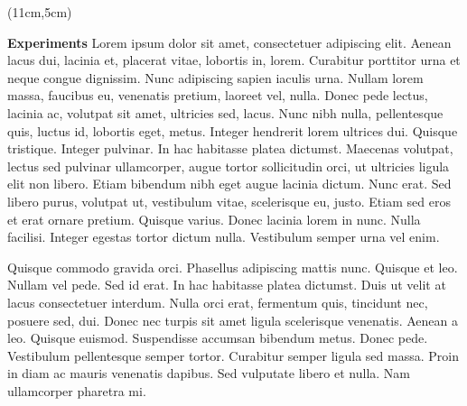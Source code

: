 \documentclass[oneside,final]{beamer}
\begin{document}
\begin{textblock*}{9cm}(11cm,5cm)\noindent%
\begin{beamerboxesrounded}[shadow=false,upper=block2up,lower=block2down]{\large\textbf{Experiments}}
Lorem ipsum dolor sit amet, consectetuer adipiscing elit. Aenean lacus dui, lacinia et, placerat vitae, lobortis in, lorem. Curabitur porttitor urna et neque congue dignissim. Nunc adipiscing sapien iaculis urna. Nullam lorem massa, faucibus eu, venenatis pretium, laoreet vel, nulla. Donec pede lectus, lacinia ac, volutpat sit amet, ultricies sed, lacus. Nunc nibh nulla, pellentesque quis, luctus id, lobortis eget, metus. Integer hendrerit lorem ultrices dui. Quisque tristique. Integer pulvinar. In hac habitasse platea dictumst. Maecenas volutpat, lectus sed pulvinar ullamcorper, augue tortor sollicitudin orci, ut ultricies ligula elit non libero. Etiam bibendum nibh eget augue lacinia dictum. Nunc erat. Sed libero purus, volutpat ut, vestibulum vitae, scelerisque eu, justo. Etiam sed eros et erat ornare pretium. Quisque varius. Donec lacinia lorem in nunc. Nulla facilisi. Integer egestas tortor dictum nulla. Vestibulum semper urna vel enim.
\par\medskip Quisque commodo gravida orci. Phasellus adipiscing mattis nunc. Quisque et leo. Nullam vel pede. Sed id erat. In hac habitasse platea dictumst. Duis ut velit at lacus consectetuer interdum. Nulla orci erat, fermentum quis, tincidunt nec, posuere sed, dui. Donec nec turpis sit amet ligula scelerisque venenatis. Aenean a leo. Quisque euismod. Suspendisse accumsan bibendum metus. Donec pede. Vestibulum pellentesque semper tortor. Curabitur semper ligula sed massa. Proin in diam ac mauris venenatis dapibus. Sed vulputate libero et nulla. Nam ullamcorper pharetra mi.
\end{beamerboxesrounded}
\end{textblock*}
\end{document}

